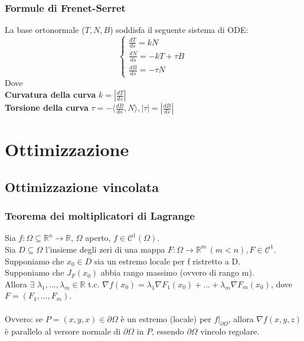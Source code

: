 \documentclass{article} %
\begin{document}
    \subsubsection*{Formule di Frenet-Serret}
    La base ortonormale ($T, N, B$) soddisfa il seguente sistema di ODE:
    \begin{equation}
        \begin{cases}
            \frac{dT}{ds} = k N \\
            \frac{dN}{ds} = -kT + \tau B \\
            \frac{dB}{ds} = - \tau N
        \end{cases}\,
    \end{equation}
    Dove \\ \textbf{Curvatura della curva} $k = \left| \frac{dT}{ds} \right| $ \\ \textbf{Torsione della curva} $ \tau = - \langle \frac{dB}{ds} , N \rangle , | \tau | = | \frac{dB}{ds} |  $


    \section{Ottimizzazione}
    \subsection*{Ottimizzazione vincolata}
    \subsubsection*{Teorema dei moltiplicatori di Lagrange}
    Sia $f:\Omega \subseteq \mathbb{R} ^n \to \mathbb{R}$, $\Omega$ aperto, $f \in \mathcal{C} ^1 (\Omega)$. \\ Sia $D \subseteq \Omega$ l'insieme degli zeri di una mappa $F: \Omega \to \mathbb{R} ^m \, (m<n), F \in \mathcal{C} ^1$. \\ Supponiamo che $x_0 \in D$ sia un estremo locale per f ristretto a D. \\ Supponiamo che $J_F(x_0)$ abbia rango massimo (ovvero di rango m). \\
    Allora $\exists$ $\lambda_1,...,\lambda_m \in \mathbb{R}$ t.c. $\nabla f(x_0) = \lambda_1 \nabla F_1(x_0) + ... + \lambda_m \nabla F_m(x_0)$, dove $F=(F_1, ... , F_m)$. \\ \\ 
    Ovvero: se $P=(x,y,x) \in \partial \Omega$ è un estremo (locale) per $f|_{\partial \Omega}$, allora $ \nabla f(x,y,z)$ è parallelo al versore normale di $\partial \Omega$ in $P$, essendo $\partial \Omega$ vincolo regolare. 
\end{document}
